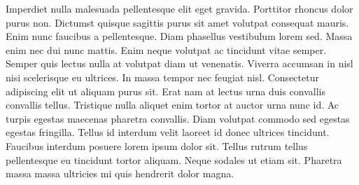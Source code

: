 Imperdiet nulla malesuada pellentesque elit eget gravida. Porttitor rhoncus dolor purus non. Dictumst quisque sagittis purus sit amet volutpat consequat mauris. Enim nunc faucibus a pellentesque. Diam phasellus vestibulum lorem sed. Massa enim nec dui nunc mattis. Enim neque volutpat ac tincidunt vitae semper. Semper quis lectus nulla at volutpat diam ut venenatis. Viverra accumsan in nisl nisi scelerisque eu ultrices. In massa tempor nec feugiat nisl. Consectetur adipiscing elit ut aliquam purus sit. Erat nam at lectus urna duis convallis convallis tellus. Tristique nulla aliquet enim tortor at auctor urna nunc id. Ac turpis egestas maecenas pharetra convallis. Diam volutpat commodo sed egestas egestas fringilla. Tellus id interdum velit laoreet id donec ultrices tincidunt. Faucibus interdum posuere lorem ipsum dolor sit. Tellus rutrum tellus pellentesque eu tincidunt tortor aliquam. Neque sodales ut etiam sit. Pharetra massa massa ultricies mi quis hendrerit dolor magna.\\